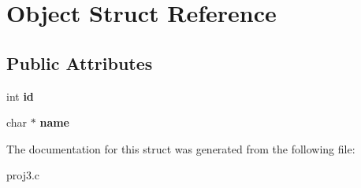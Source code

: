 \hypertarget{structObject}{}\section{Object Struct Reference}
\label{structObject}
\subsection*{Public Attributes}
\begin{DoxyCompactItemize}
\item 
\hypertarget{structObject_aa7caf12457afb8b79152cfaf0158c827}{}int {\bfseries id}\label{structObject_aa7caf12457afb8b79152cfaf0158c827}

\item 
\hypertarget{structObject_a1792dbef505e3bb7eab133117b431010}{}char $\ast$ {\bfseries name}\label{structObject_a1792dbef505e3bb7eab133117b431010}

\end{DoxyCompactItemize}


The documentation for this struct was generated from the following file\+:\begin{DoxyCompactItemize}
\item 
proj3.\+c\end{DoxyCompactItemize}
